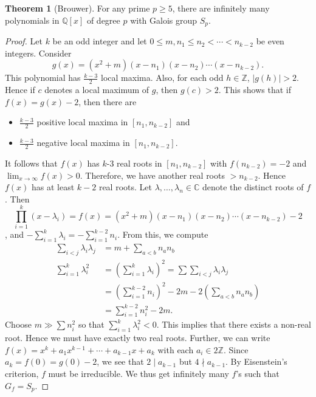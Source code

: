\documentclass[10pt,letterpaper,cm]{nupset}
\theoremstyle{definition}
\theoremstyle{theorem}
\newtheorem{theorem}[definition]{Theorem}
\theoremstyle{remark}
\newcommand{\C}{\mathbb C}
\newcommand{\Q}{\mathbb Q}
\newcommand{\Z}{\mathbb Z}
\newcommand{\1}{\mathbf{1}}
\newcommand{\0}{\vec 0}
\begin{document}
\begin{theorem}[Brouwer]
For any prime $p \geq 5$, there are infinitely many polynomials in $\Q[x]$ of degree $p$ with Galois group $S_p$.
\end{theorem}
\begin{proof}
Let $k$ be an odd integer and let $0\leq m, n_1 \leq n_2 < \cdots < n_{k-2}$ be even integers. Consider $$g(x) = \left(x^2 +m\right)\left(x-n_1\right)\left(x-n_2\right) \cdots \left(x-n_{k-2}\right).$$ This polynomial has $\frac{k-3}{2}$ local maxima. Also, for each odd $h\in \Z$, $\left\lvert{g(h)}\right\rvert >2$. Hence if $c$ denotes a local maximum of $g$, then $g(c) >2$. This shows that if $f(x) = g(x) -2$, then there are 
\begin{itemize}
\item $\frac{k-3}{2}$ positive local maxima in $[n_1, n_{k-2}]$ and
\item $\frac{k-3}{2}$ negative local maxima in $[n_1, n_{k-2}]$.
\end{itemize}
It follows that $f(x)$ has $k$-3 real roots in $[n_1, n_{k-2}]$ with $f(n_{k-2}) = {-2}$ and $\lim_{x\to \infty} f(x) >0$. Therefore, we have another real roots $> n_{k-2}$. Hence $f(x)$ has at least $k-2$ real roots. Let $\lambda, \ldots, \lambda_n \in \C$ denote the distinct roots of $f$. Then $$\prod_{i=1}^k(x-\lambda_i) = f(x) = \left(x^2 +m\right)\left(x-n_1\right)\left(x-n_2\right) \cdots \left(x-n_{k-2}\right) -2$$, and ${-}\sum_{i=1}^k \lambda_i = {- \sum_{i=1}^{k-2} n_i}$. From this, we compute
\begin{align*}
\sum_{i <j} \lambda_i \lambda_j & = m + \sum_{a < b} n_an_b 
\\ \sum_{i=1}^k \lambda_i^2 & = \left(\sum_{i=1}^k \lambda_i \right)^2 = \sum \sum_{i<j} \lambda _i \lambda_j
\\ & = \left( \sum_{i=1}^{k-2} n_i \right)^2 -2m - 2 \left( \sum_{a<b} n_an_b \right)
\\ & = \sum_{i=1}^{k-2} n_i^2 - 2m.
\end{align*}
Choose $m \gg \sum n_i^2$ so that $\sum_{i=1}^k \lambda_i^2  < 0$. This implies that there exists a non-real root. Hence we must have exactly two real roots. Further,  we can write $f(x) = x^k + a_1x^{k-1} + \cdots +a_{k-1} x +a_k$ with each $a_i \in 2\Z$. Since $a_k = f(0) = g(0) -2$, we see that $2 \mid a_{k-1}$ but $4 \nmid a_{k-1}$. By Eisenstein's criterion, $f$ must be irreducible. We thus get infinitely many $f$'s such that $G_f = S_p$. 
\end{proof}
\end{document}
